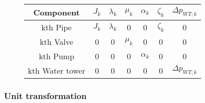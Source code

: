 \begin{figure}[H]
	\centering
\begin{tabular}{c|cccccc} 
  			\bfseries Component    &     $J_k$    &     $\lambda_k$    &    $\mu_k$    &   $\alpha_k$    &  $\zeta_k$   &	$\Delta p_{WT;k}$	\\ \hline
			kth Pipe		  	   &     $J_k$    &     $\lambda_k$    &    0          &   0             &  $\zeta_k$   &   0	    			\\ 
			kth Valve              &     0        &     0              &    $\mu_k$    &   0 		     &  0    		&   0					\\ 
			kth Pump 		       &     0        &     0              &    0          &   $\alpha_k$    &  0    		&   0	    			\\
			kth Water tower 	   &     0        &     0              &    0          &   0             &  0    		&   $\Delta p_{WT;k}$	    
\end{tabular}
		\label{tab:parametrization_model}

\end{figure}	

\subsubsection{Unit transformation}
\label{unittransform}

